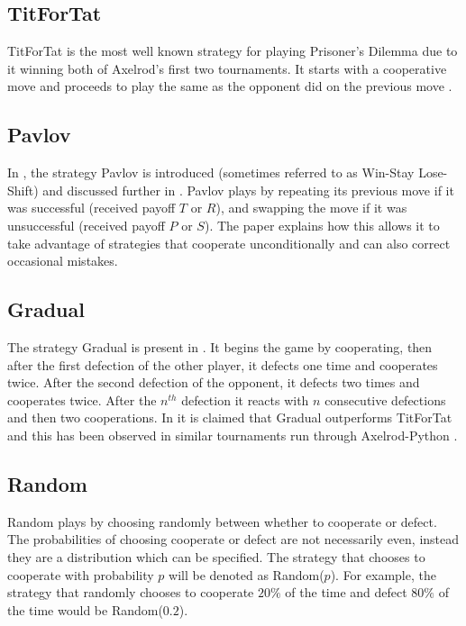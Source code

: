 \subsection{TitForTat}\label{ssec:stra_titfortat}
TitForTat is the most well known strategy for playing Prisoner's Dilemma due to it winning both of Axelrod's first two tournaments.
It starts with a cooperative move and proceeds to play the same as the opponent did on the previous move \cite{Axelrod1980b, Heap2003}.


\subsection{Pavlov}\label{ssec:strat_pavlov}
In \cite{Kraines1989}, the strategy Pavlov is introduced (sometimes referred to as Win-Stay Lose-Shift) and discussed further in \cite{Nowak1993}.
Pavlov plays by repeating its previous move if it was successful (received payoff $T$ or $R$), and swapping the move if it was unsuccessful (received payoff $P$ or $S$).
The paper explains how this allows it to take advantage of strategies that cooperate unconditionally and can also correct occasional mistakes.

\subsection{Gradual}\label{ssec:strat_gradual}
The strategy Gradual is present in \cite{Beaufils1997}.
It begins the game by cooperating, then after the first defection of the other player, it defects one time and cooperates twice.
After the second defection of the opponent, it defects two times and cooperates twice.
After the $n^{th}$ defection it reacts with $n$ consecutive defections and then two cooperations.
In \cite{Beaufils1997} it is claimed that Gradual outperforms TitForTat and this has been observed in similar tournaments run through Axelrod-Python \cite{axelrodproject}.


\subsection{Random}\label{ssec:strat_random}
Random plays  by choosing randomly between whether to cooperate or defect.
The probabilities of choosing cooperate or defect are not necessarily even, instead they are a distribution which can be specified.
The strategy that chooses to cooperate with probability $p$ will be denoted as Random($p$).
For example, the strategy that randomly chooses to cooperate $20\%$ of the time and defect $80\%$ of the time would be Random($0.2$).

